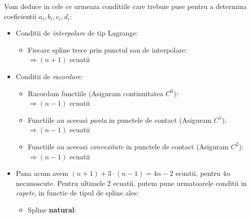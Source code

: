 \documentclass{article}
\begin{document}
Vom deduce in cele ce urmeaza conditiile care trebuie puse pentru a determina coeficientii $a_i, b_i, c_i, d_i$:


\begin{itemize}
    \item Conditii de \textit{interpolare} de tip Lagrange:
    \begin{itemize}
        \item Fiecare spline trece prin punctul sau de interpolare:
        \\$\Rightarrow (n+1)$ ecuatii
    \end{itemize}
    
    \item Conditii de \textit{racordare}:
    \begin{itemize}
        \item Racordam functiile (Asiguram continuitatea $C^0$):
        \\$\Rightarrow (n-1)$ ecuatii
        
        \item Functiile au aceeasi \textit{panta} in punctele de contact (Asiguram $C^1$):
        \\$\Rightarrow (n-1)$ ecuatii
        
        \item Functiile au aceeasi \textit{convexitate} in punctele de contact (Asiguram $C^2$):
        \\$\Rightarrow (n-1)$ ecuatii
    \end{itemize}
    
    \item Pana acum avem $(n+1) + 3 \cdot (n-1) = 4n - 2$ ecuatii, pentru $4n$ necunoscute. Pentru ultimele 2 ecuatii, putem pune urmatoarele conditii in \textit{capete}, in functie de tipul de spline ales:
    
    \begin{minipage}{0.5\textwidth}
        \begin{itemize}
            \item Spline \textbf{natural}:
        

\end{itemize}
\end{minipage}
\end{itemize}
\end{document}
